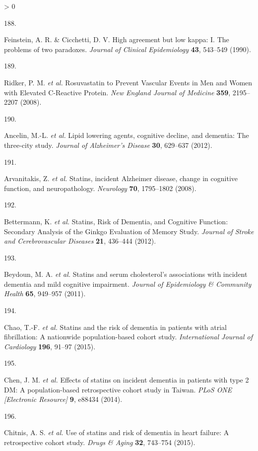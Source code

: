 \documentclass[a4paper, twoside]{templates/ociamthesis}
\newlength{\cslhangindent}
\newlength{\csllabelwidth}
\newenvironment{CSLReferences}[3] %
 {%
  \setlength{\parindent}{0pt}
  \ifodd #1 \everypar{\setlength{\hangindent}{\cslhangindent}}\ignorespaces\fi
  \ifnum #2 > 0
  \setlength{\parskip}{#2\baselineskip}
  \fi
 }%
 {}
\newcommand{\CSLLeftMargin}[1]{\parbox[t]{\maxof{\widthof{#1}}{\csllabelwidth}}{#1}}
\newcommand{\CSLRightInline}[1]{\parbox[t]{\linewidth - \csllabelwidth}{#1}}
\begin{document}
\begin{CSLReferences}{0}{0}
\leavevmode\hypertarget{ref-feinstein1990}{}%
\CSLLeftMargin{188. }
\CSLRightInline{Feinstein, A. R. \& Cicchetti, D. V. High agreement but low kappa: I. {The} problems of two paradoxes. \emph{Journal of Clinical Epidemiology} \textbf{43}, 543--549 (1990).}

\leavevmode\hypertarget{ref-ridker2008}{}%
\CSLLeftMargin{189. }
\CSLRightInline{Ridker, P. M. \emph{et al.} Rosuvastatin to {Prevent Vascular Events} in {Men} and {Women} with {Elevated C}-{Reactive Protein}. \emph{New England Journal of Medicine} \textbf{359}, 2195--2207 (2008).}

\leavevmode\hypertarget{ref-ancelin2012}{}%
\CSLLeftMargin{190. }
\CSLRightInline{Ancelin, M.-L. \emph{et al.} Lipid lowering agents, cognitive decline, and dementia: The three-city study. \emph{Journal of Alzheimer's Disease} \textbf{30}, 629--637 (2012).}

\leavevmode\hypertarget{ref-arvanitakis2008}{}%
\CSLLeftMargin{191. }
\CSLRightInline{Arvanitakis, Z. \emph{et al.} Statins, incident {Alzheimer} disease, change in cognitive function, and neuropathology. \emph{Neurology} \textbf{70}, 1795--1802 (2008).}

\leavevmode\hypertarget{ref-bettermann2012}{}%
\CSLLeftMargin{192. }
\CSLRightInline{Bettermann, K. \emph{et al.} Statins, {Risk} of {Dementia}, and {Cognitive Function}: Secondary {Analysis} of the {Ginkgo Evaluation} of {Memory Study}. \emph{Journal of Stroke and Cerebrovascular Diseases} \textbf{21}, 436--444 (2012).}

\leavevmode\hypertarget{ref-beydoun2011}{}%
\CSLLeftMargin{193. }
\CSLRightInline{Beydoun, M. A. \emph{et al.} Statins and serum cholesterol's associations with incident dementia and mild cognitive impairment. \emph{Journal of Epidemiology \& Community Health} \textbf{65}, 949--957 (2011).}

\leavevmode\hypertarget{ref-chao2015}{}%
\CSLLeftMargin{194. }
\CSLRightInline{Chao, T.-F. \emph{et al.} Statins and the risk of dementia in patients with atrial fibrillation: A nationwide population-based cohort study. \emph{International Journal of Cardiology} \textbf{196}, 91--97 (2015).}

\leavevmode\hypertarget{ref-chen2014}{}%
\CSLLeftMargin{195. }
\CSLRightInline{Chen, J. M. \emph{et al.} Effects of statins on incident dementia in patients with type 2 {DM}: A population-based retrospective cohort study in {Taiwan}. \emph{PLoS ONE {[}Electronic Resource{]}} \textbf{9}, e88434 (2014).}

\leavevmode\hypertarget{ref-chitnis2015}{}%
\CSLLeftMargin{196. }
\CSLRightInline{Chitnis, A. S. \emph{et al.} Use of statins and risk of dementia in heart failure: A retrospective cohort study. \emph{Drugs \& Aging} \textbf{32}, 743--754 (2015).}


\end{CSLReferences}
\end{document}
